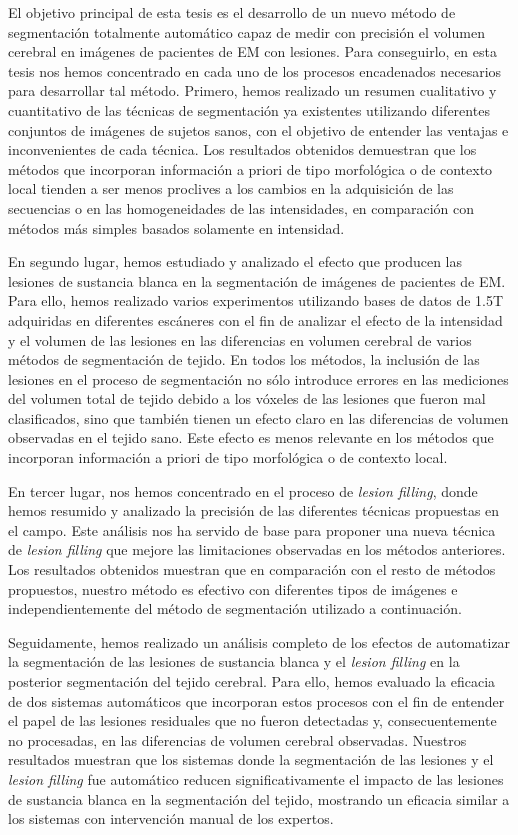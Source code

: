 El objetivo principal de esta tesis es el desarrollo de un nuevo método de segmentación totalmente automático capaz de medir con precisión el volumen cerebral en imágenes de pacientes de EM con lesiones. Para conseguirlo, en esta tesis nos hemos concentrado en cada uno de los procesos encadenados necesarios para desarrollar tal método. Primero, hemos realizado un resumen cualitativo y cuantitativo de las técnicas de segmentación ya existentes utilizando diferentes conjuntos de imágenes de sujetos sanos, con el objetivo de entender las ventajas e inconvenientes de cada técnica. Los resultados obtenidos demuestran que los métodos que incorporan información a priori de tipo morfológica o de contexto local tienden a ser menos proclives a los cambios en la adquisición de las secuencias o  en las homogeneidades de las intensidades, en comparación con métodos más simples basados solamente en intensidad.

En segundo lugar, hemos estudiado y analizado el efecto que producen las lesiones de sustancia blanca en la segmentación de imágenes de pacientes de EM. Para ello, hemos realizado varios experimentos utilizando bases de datos de 1.5T adquiridas en diferentes escáneres con el fin de analizar el efecto de la intensidad y el volumen de las lesiones en las diferencias en volumen cerebral de varios métodos de segmentación de tejido. En todos los métodos, la inclusión de las lesiones en el proceso de segmentación no sólo introduce errores en las mediciones del volumen total de tejido debido a los vóxeles de las lesiones que fueron mal clasificados, sino que también tienen un efecto claro en las diferencias de volumen observadas en el tejido sano. Este efecto es menos relevante en los métodos que incorporan información a priori de tipo morfológica o de contexto local.

En tercer lugar, nos hemos concentrado en el proceso de \textit{lesion filling}, donde hemos resumido y analizado la precisión de las diferentes técnicas propuestas en el campo. Este análisis nos ha servido de base para proponer una nueva técnica de \textit{lesion filling} que mejore las limitaciones observadas en los métodos anteriores. Los resultados obtenidos muestran que en comparación con el resto de métodos propuestos, nuestro método es efectivo con diferentes tipos de imágenes e independientemente del método de segmentación utilizado a continuación. 

Seguidamente, hemos realizado un análisis completo de los efectos de automatizar la segmentación de las lesiones de sustancia blanca y el \textit{lesion filling}  
en la posterior segmentación del tejido cerebral. Para ello, hemos evaluado la eficacia de dos sistemas automáticos que incorporan estos procesos con el fin de entender el papel de las lesiones residuales que no fueron detectadas y, consecuentemente no procesadas, en las diferencias de volumen cerebral observadas. Nuestros resultados muestran que los sistemas donde la segmentación de las lesiones y el \textit{lesion filling} fue automático reducen significativamente el impacto de las lesiones de sustancia blanca en la segmentación del tejido, mostrando un eficacia similar a los sistemas con intervención manual de los expertos. 


